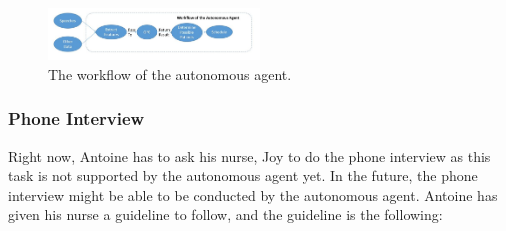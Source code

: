 \documentclass{article}
\begin{document}
	\begin{figure}[h]
	    \begin{center}
		\includegraphics[width=0.5\textwidth]{workflow_agent}
	    \end{center}
	    \caption{The workflow of the autonomous agent.}
	    \label{figure:workflow_agent}
	\end{figure}
	
	\subsubsection{Phone Interview}
	
	Right now, Antoine has to ask his nurse, Joy to do the phone interview as this task is not supported by the autonomous agent yet. 
	In the future, the phone interview might be able to be conducted by the autonomous agent.
	Antoine has given his nurse a guideline to follow, and the guideline is the following:
	
\end{document}

